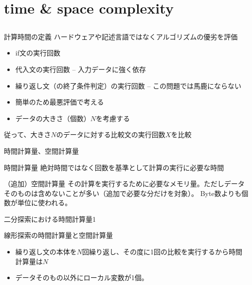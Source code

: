 \documentclass{beamer}
\subtitle{}
\begin{document}
\begin{frame}[fragile]{}
\titlepage
\end{frame}

\section{time \& space complexity}		%
\subsection{}

\begin{frame}[fragile]{計算時間の定義}{}
ハードウェアや記述言語ではなくアルゴリズムの優劣を評価
\begin{itemize}%
\item if文の実行回数
\item 代入文の実行回数 -- 入力データに強く依存
\item 繰り返し文（の終了条件判定）の実行回数 -- この問題では馬鹿にならない
\end{itemize}

\begin{itemize}\itemsep8pt
\item 簡単のため最悪評価で考える
\item データの大きさ（個数）$N$を考慮する
\end{itemize}

\vfill
従って、大きさ$N$のデータに対する比較文の実行回数$X$を比較
\end{frame}

\begin{frame}[fragile]{時間計算量、空間計算量}{}
\begin{block}{時間計算量}
絶対時間ではなく回数を基準として計算の実行に必要な時間
\end{block}
\begin{block}{（追加）空間計算量}
その計算を実行するために必要なメモリ量。ただしデータそのものは含めないことが多い（追加で必要な分だけを対象）。
Byte数よりも個数が単位に使われる。
\end{block}
\end{frame}

\begin{frame}[fragile]{二分探索における時間計算量1}{}

\begin{exampleblock}{線形探索の時間計算量と空間計算量}
\begin{itemize}%
\item 繰り返し文の本体を$N$回繰り返し、その度に1回の比較を実行するから時間計算量は$N$
\item データそのもの以外にローカル変数が1個。
\end{itemize}
\end{exampleblock}
\end{frame}
\end{document}
